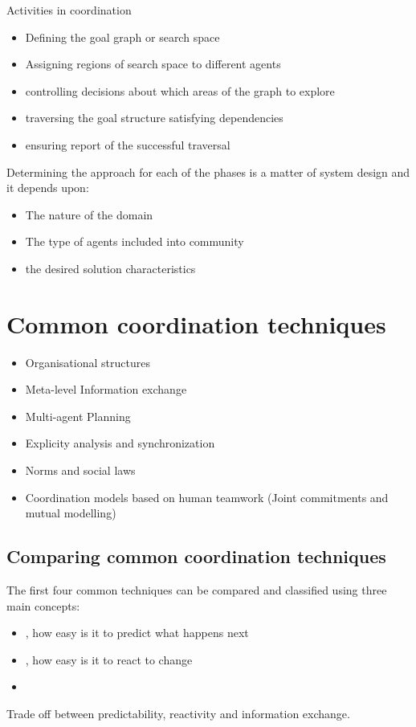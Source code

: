 Activities in coordination
\begin{itemize}
\item Defining the goal graph or search space
\item Assigning regions of search space to different agents
\item controlling decisions about which areas of the graph to explore
\item traversing the goal structure satisfying dependencies
\item ensuring report of the successful traversal
\end{itemize}
Determining the approach for each of the phases is a matter of system design and it depends upon:
\begin{itemize}
\item The nature of the domain
\item The type of agents included into community
\item the desired solution characteristics
\end{itemize}

\section{Common coordination techniques}
\begin{itemize}
\item Organisational structures
\item Meta-level Information exchange
\item Multi-agent Planning
\item Explicity analysis and synchronization
\item Norms and social laws
\item Coordination models based on human teamwork (Joint commitments and mutual modelling)
\end{itemize}

\subsection{Comparing common coordination techniques}
The first four common techniques can be compared and classified using three main concepts:
\begin{itemize}
\item {}, how easy is it to predict what happens next
\item {}, how easy is it to react to change
\item {}
\end{itemize}
Trade off between predictability, reactivity and information exchange.

